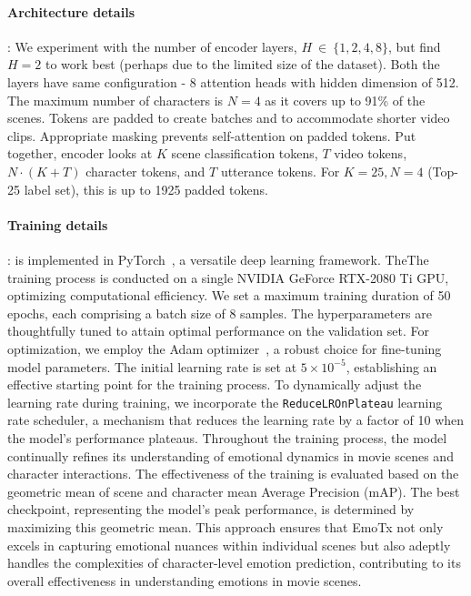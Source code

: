 \paragraph{Architecture details}:
We experiment with the number of encoder layers, $H\ {\in}\ \{1, 2, 4, 8\}$, but find $H {=} 2$ to work best (perhaps due to the limited size of the dataset).
Both the layers have same configuration - 8 attention heads with hidden dimension of 512.
The maximum number of characters is $N{=}4$ as it covers up to 91\% of the scenes.
Tokens are padded to create batches and to accommodate shorter video clips.
Appropriate masking prevents self-attention on padded tokens.
Put together, \modelname{} encoder looks at $K$ scene classification tokens, $T$ video tokens, $N \cdot (K + T)$ character tokens, and $T$ utterance tokens.
For $K{=}25, N{=}4$ (Top-25 label set), this is up to 1925 padded tokens.

\paragraph{Training details}:
\modelname{} is implemented in PyTorch~\cite{pytorch}, a versatile deep learning framework. TheThe training process is conducted on a single NVIDIA GeForce RTX-2080 Ti GPU, optimizing computational efficiency. We set a maximum training duration of 50 epochs, each comprising a batch size of 8 samples. The hyperparameters are thoughtfully tuned to attain optimal performance on the validation set. For optimization, we employ the Adam optimizer~\cite{adam}, a robust choice for fine-tuning model parameters. The initial learning rate is set at $5 \times 10^{-5}$, establishing an effective starting point for the training process. To dynamically adjust the learning rate during training, we incorporate the \texttt{ReduceLROnPlateau} learning rate scheduler, a mechanism that reduces the learning rate by a factor of 10 when the model's performance plateaus. Throughout the training process, the model continually refines its understanding of emotional dynamics in movie scenes and character interactions. The effectiveness of the training is evaluated based on the geometric mean of scene and character mean Average Precision (mAP). The best checkpoint, representing the model's peak performance, is determined by maximizing this geometric mean. This approach ensures that EmoTx not only excels in capturing emotional nuances within individual scenes but also adeptly handles the complexities of character-level emotion prediction, contributing to its overall effectiveness in understanding emotions in movie scenes.

